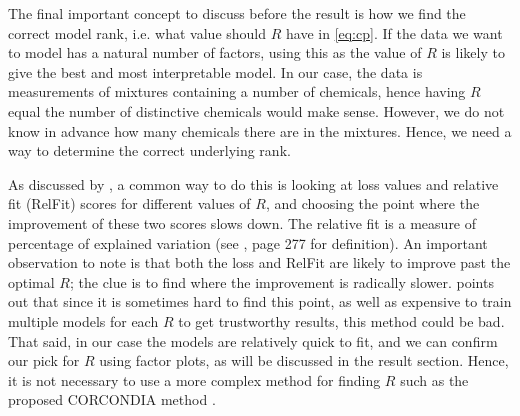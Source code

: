 The final important concept to discuss before the result is how we find the correct model rank, i.e. what value should $R$ have in \eqref{eq:cp}.
If the data we want to model has a natural number of factors, using this as the value of $R$ is likely to give the best and most interpretable model.
In our case, the data is measurements of mixtures containing a number of chemicals, hence having $R$ equal the number of distinctive chemicals would make sense.
However, we do not know in advance how many chemicals there are in the mixtures.
Hence, we need a way to determine the correct underlying rank.

As discussed by \textcite{corcondia}, a common way to do this is looking at loss values and relative fit (RelFit) scores for different values of $R$, and choosing the point where the improvement of these two scores slows down.
The relative fit is a measure of percentage of explained variation (see \textcite{corcondia}, page 277 for definition).
An important observation to note is that both the loss and RelFit are likely to improve past the optimal $R$; the clue is to find where the improvement is radically slower.
\textcite{corcondia} points out that since it is sometimes hard to find this point, as well as expensive to train multiple models for each $R$ to get trustworthy results, this method could be bad.
That said, in our case the models are relatively quick to fit, and we can confirm our pick for $R$ using factor plots, as will be discussed in the result section.
Hence, it is not necessary to use a more complex method for finding $R$ such as the proposed CORCONDIA method \cite{corcondia}.

